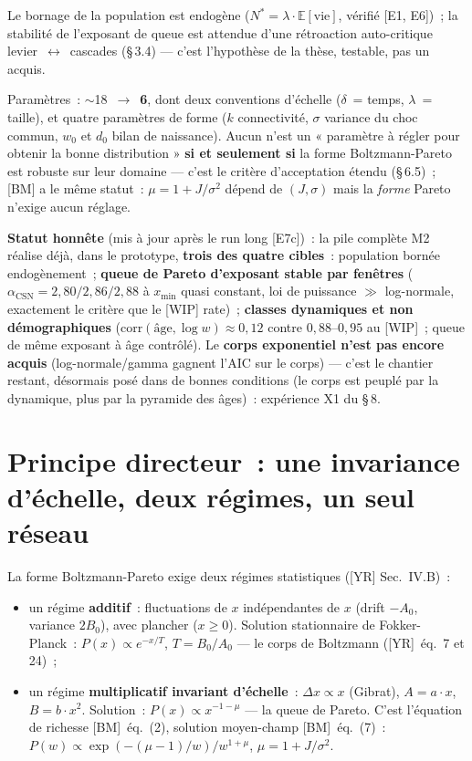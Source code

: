 \documentclass[11pt,a4paper]{article}
\begin{document}
Le bornage de la population est endogène ($N^* = \lambda\cdot\mathbb E[\text{vie}]$, vérifié [E1, E6])~; la stabilité de l'exposant de queue est attendue d'une rétroaction auto-critique levier~$\leftrightarrow$~cascades (\S\,3.4) --- c'est l'hypothèse de la thèse, testable, pas un acquis.

Paramètres~: $\sim$18~$\to$~\textbf{6}, dont deux conventions d'échelle ($\delta$~= temps, $\lambda$~= taille), et quatre paramètres de forme ($k$ connectivité, $\sigma$ variance du choc commun, $w_0$ et $d_0$ bilan de naissance). Aucun n'est un « paramètre à régler pour obtenir la bonne distribution » \textbf{si et seulement si} la forme Boltzmann-Pareto est robuste sur leur domaine --- c'est le critère d'acceptation étendu (\S\,6.5)~; [BM] a le même statut~: $\mu = 1 + J/\sigma^2$ dépend de $(J,\sigma)$ mais la \emph{forme} Pareto n'exige aucun réglage.

\textbf{Statut honnête} (mis à jour après le run long [E7c])~: la pile complète M2 réalise déjà, dans le prototype, \textbf{trois des quatre cibles}~: population bornée endogènement~; \textbf{queue de Pareto d'exposant stable par fenêtres} ($\alpha_{\mathrm{CSN}} = 2{,}80/2{,}86/2{,}88$ à $x_{\min}$ quasi constant, loi de puissance $\gg$ log-normale, exactement le critère que le [WIP] rate)~; \textbf{classes dynamiques et non démographiques} ($\mathrm{corr}(\text{âge}, \log w) \approx 0{,}12$ contre $0{,}88$--$0{,}95$ au [WIP]~; queue de même exposant à âge contrôlé). Le \textbf{corps exponentiel n'est pas encore acquis} (log-normale/gamma gagnent l'AIC sur le corps) --- c'est le chantier restant, désormais posé dans de bonnes conditions (le corps est peuplé par la dynamique, plus par la pyramide des âges)~: expérience X1 du \S\,8.

\section{Principe directeur~: une invariance d'échelle, deux régimes, un seul réseau}
\label{sec:principe}

La forme Boltzmann-Pareto exige deux régimes statistiques ([YR] Sec.~IV.B)~:

\begin{itemize}
  \item un régime \textbf{additif}~: fluctuations de $x$ indépendantes de $x$ (drift $-A_0$, variance $2B_0$), avec plancher ($x\geq 0$). Solution stationnaire de Fokker-Planck~: $P(x) \propto e^{-x/T}$, $T = B_0/A_0$ --- le corps de Boltzmann ([YR]~éq.~7 et 24)~;
  \item un régime \textbf{multiplicatif invariant d'échelle}~: $\Delta x \propto x$ (Gibrat), $A = a\cdot x$, $B = b\cdot x^2$. Solution~: $P(x) \propto x^{-1-\mu}$ --- la queue de Pareto. C'est l'équation de richesse [BM]~éq.~(2), solution moyen-champ [BM]~éq.~(7)~: $P(w) \propto \exp(-(\mu-1)/w)/w^{1+\mu}$, $\mu = 1 + J/\sigma^2$.
\end{itemize}
\end{document}
